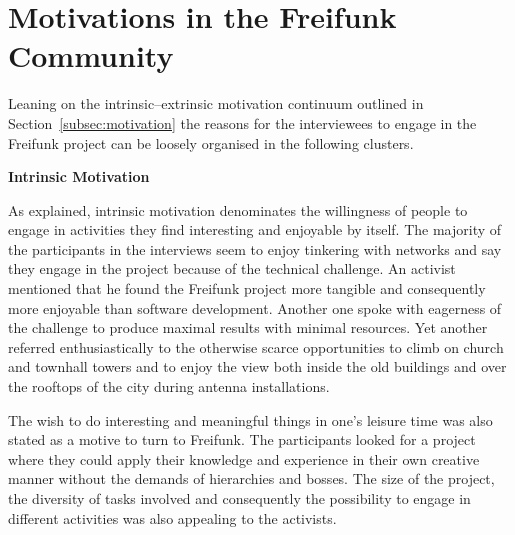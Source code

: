 \section{Motivations in the Freifunk Community}

\begin{comment}
\begin{itemize}
  \item is the focus of the paper;
  \item only pull up the foss motivations as comparison to underline similarities and differences with the foundings here
  \item general part of the questionnaire $\rightarrow$ cluster answers
  \item some graphs/tables on the specific questions
\end{itemize}
\end{comment}

Leaning on the intrinsic--extrinsic motivation continuum outlined in Section~\ref{subsec:motivation} the reasons for the interviewees to engage in the Freifunk project can be loosely organised in the following clusters.

\textbf{Intrinsic Motivation}

As explained, intrinsic motivation denominates the willingness of people to engage in activities they find interesting and enjoyable by itself.
The majority of the participants in the interviews seem to enjoy tinkering with networks and say they engage in the project because of the technical challenge.
An activist mentioned that he found the Freifunk project more tangible and consequently more enjoyable than software development.
Another one spoke with eagerness of the challenge to produce maximal results with minimal resources.
Yet another referred enthusiastically to the otherwise scarce opportunities to climb on church and townhall towers and to enjoy the view both inside the old buildings and over the rooftops of the city during antenna installations.

The wish to do interesting and meaningful things in one's leisure time was also stated as a motive to turn to Freifunk.
The participants looked for a project where they could apply their knowledge and experience in their own creative manner without the demands of hierarchies and bosses.
The size of the project, the diversity of tasks involved and consequently the possibility to engage in different activities was also appealing to the activists.

